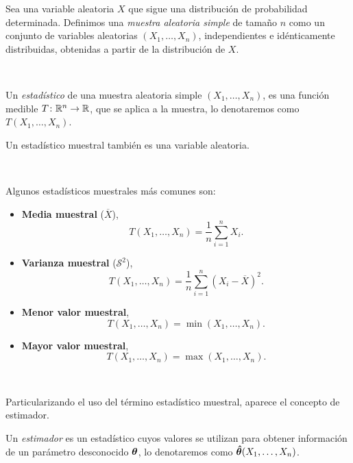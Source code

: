 \documentclass[oneside,openright,titlepage,numbers=noenddot,openany,headinclude,footinclude=true,
cleardoublepage=empty,abstractoff,BCOR=5mm,paper=a4,fontsize=12pt,main=spanish]{scrreprt}
\begin{document}
\begin{definition}
Sea una variable aleatoria $X$ que sigue una distribución de probabilidad determinada. Definimos una \textit{muestra aleatoria simple} de tamaño $n$ como un conjunto de variables aleatorias $(X_1,\dots,X_n)$, independientes e idénticamente distribuidas, obtenidas a partir de la distribución de $X$.
\end{definition}\

\begin{definition}
Un \textit{estadístico} de una muestra aleatoria simple $(X_1,\dots,X_n)$, es una función medible $T\colon \mathbb{R}^n \to \mathbb{R}$, que se aplica a la muestra, lo denotaremos como $T(X_1,\dots,X_n)$.\\
\begin{remark}
Un estadístico muestral también es una variable aleatoria.
\end{remark}
\end{definition}\

\begin{example}
Algunos estadísticos muestrales más comunes son:
\begin{itemize}
    \item \textbf{Media muestral} ($\overline{X}$), $$ T(X_1,\dots,X_n)=\frac{1}{n}\sum_{i=1}^n X_i.$$
    \item \textbf{Varianza muestral} ($\mathcal{S}^2$),  $$ T(X_1,\dots,X_n)=\frac{1}{n}\sum_{i=1}^n (X_i-\overline{X})^2.$$
    \item \textbf{Menor valor muestral}, $$ T(X_1,\dots,X_n)=\min (X_1,\dots,X_n).$$
    \item \textbf{Mayor valor muestral},  $$ T(X_1,\dots,X_n)=\max (X_1,\dots,X_n).$$
\end{itemize}
\end{example}\

Particularizando el uso del término estadístico muestral, aparece el concepto de estimador.\\

\begin{definition}[Estimador]
Un \textit{estimador} es un estadístico cuyos valores se utilizan para obtener información de un parámetro desconocido $\bm{\theta}$, lo denotaremos como $\bm{\hat{\theta}} (X_1,\dots,X_n)$.
\end{definition}
\end{document}

